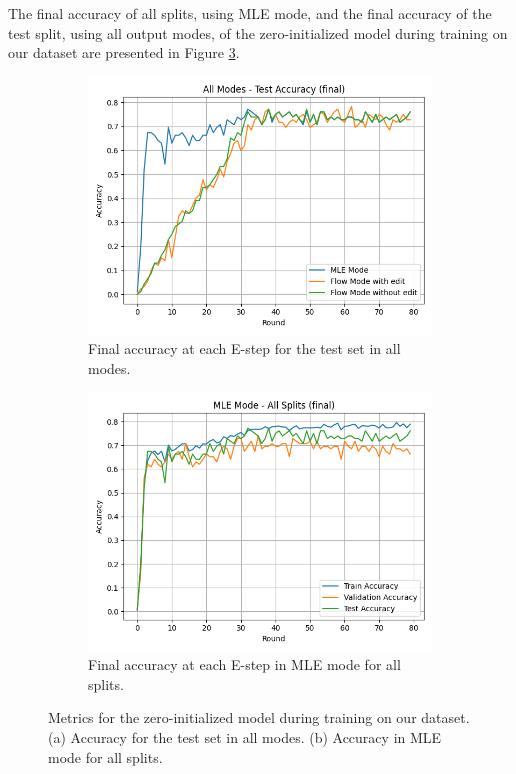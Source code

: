 The final accuracy of all splits, using MLE mode, and the final accuracy of the test split, using all output modes, of the zero-initialized model during training on our dataset are presented in Figure \ref{fig:acc-loss-splits}.
\begin{figure}[H]
    \centering
    \begin{subfigure}[b]{0.46\textwidth}
        \centering
        \includegraphics[width=\textwidth]{Images/final_accuracy_all_modes_test.png}
        \caption{Final accuracy at each E-step for the test set in all modes.}
        \label{fig:final-acc-test-all}
    \end{subfigure}\hfill
    \begin{subfigure}[b]{0.46\textwidth}
        \centering
        \includegraphics[width=\textwidth]{Images/final_accuracy_mle_mode_all_splits.png}
        \caption{Final accuracy at each E-step in MLE mode for all splits.}
        \label{fig:final-acc-mle-all}
    \end{subfigure}
    \caption{Metrics for the zero-initialized model during training on our dataset. \\ 
    (a) Accuracy for the test set in all modes. (b) Accuracy in MLE mode for all splits.}
    \label{fig:acc-loss-splits}
\end{figure}